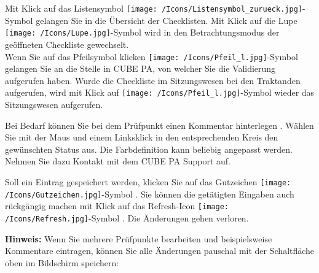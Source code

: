 \vspace{\baselineskip}

Mit Klick auf das Listensymbol \texttt{[image: /Icons/Listensymbol\_zurueck.jpg]}-Symbol  gelangen Sie in die Übersicht der Checklisten. Mit Klick auf die Lupe \texttt{[image: /Icons/Lupe.jpg]}-Symbol  wird in den Betrachtungsmodus der geöffneten Checkliste gewechselt. \\
Wenn Sie auf das Pfeilsymbol klicken \texttt{[image: /Icons/Pfeil\_l.jpg]}-Symbol  gelangen Sie an die Stelle in CUBE PA, von welcher Sie die Validierung aufgerufen haben. Wurde die Checkliste im Sitzungswesen bei den Traktanden aufgerufen, wird mit Klick auf \texttt{[image: /Icons/Pfeil\_l.jpg]}-Symbol  wieder das Sitzungswesen aufgerufen.

\vspace{\baselineskip}

Bei Bedarf können Sie bei dem Prüfpunkt einen Kommentar hinterlegen . Wählen Sie mit der Maus und einem Linksklick in den entsprechenden Kreis den gewünschten Status aus. Die Farbdefinition kann beliebig angepasst werden. Nehmen Sie dazu Kontakt mit dem CUBE PA Support auf.

\vspace{\baselineskip}

Soll ein Eintrag gespeichert werden, klicken Sie auf das Gutzeichen \texttt{[image: /Icons/Gutzeichen.jpg]}-Symbol . Sie können die getätigten Eingaben auch rückgängig machen mit Klick auf das Refresh-Icon \texttt{[image: /Icons/Refresh.jpg]}-Symbol . Die Änderungen gehen verloren.

\vspace{\baselineskip}

\textbf{Hinweis:} Wenn Sie mehrere Prüfpunkte bearbeiten und beispielsweise Kommentare eintragen, können Sie alle Änderungen pauschal mit der Schaltfläche oben im Bildschirm speichern:

\begin{figure}[H]
\end{figure}
